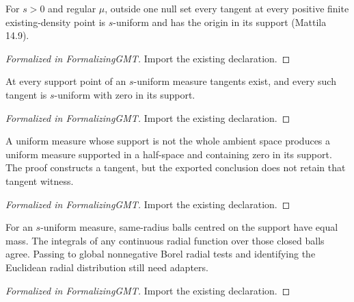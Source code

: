 \begin{theorem}
\label{thm:uniform-upstream}
\leanok
{}
For $s>0$ and regular $\mu$, outside one null set every tangent at every positive finite existing-density point is $s$-uniform and has the origin in its support (Mattila 14.9).
\end{theorem}
\begin{proof}[Formalized in FormalizingGMT]
\leanok
{}
Import the existing declaration.
\end{proof}

\begin{lemma}
\label{gmt:uniform-tangents}
\leanok
{}
At every support point of an $s$-uniform measure tangents exist, and every such tangent is $s$-uniform with zero in its support.
\end{lemma}
\begin{proof}[Formalized in FormalizingGMT]
\leanok
{}
Import the existing declaration.
\end{proof}

\begin{lemma}
\label{gmt:uniform-halfspace}
\leanok
{}
A uniform measure whose support is not the whole ambient space produces a uniform measure supported in a half-space and containing zero in its support. The proof constructs a tangent, but the exported conclusion does not retain that tangent witness.
\end{lemma}
\begin{proof}[Formalized in FormalizingGMT]
\leanok
{}
Import the existing declaration.
\end{proof}

\begin{lemma}
\label{gmt:uniform-radial}
\leanok
{}
For an $s$-uniform measure, same-radius balls centred on the support have equal mass. The integrals of any continuous radial function over those closed balls agree. Passing to global nonnegative Borel radial tests and identifying the Euclidean radial distribution still need adapters.
\end{lemma}
\begin{proof}[Formalized in FormalizingGMT]
\leanok
Import the existing declaration.
\end{proof}

